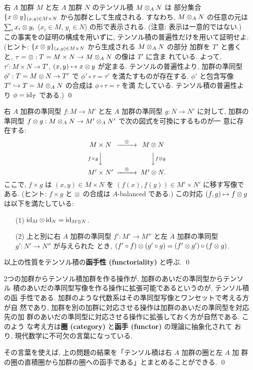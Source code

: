 \documentclass[12pt,twoside]{jarticle}
\begin{document}
\begin{question}
\label{q:right-exact-1}
  右 $A$ 加群 $M$ と左 $A$ 加群 $N$ のテンソル積 $M\otimes_A N$ は %
  部分集合 $\{x\otimes y\}_{(x,y)\in M\times N}$ から加群として生成される.
  すなわち, $M\otimes_A N$ の任意の元は $\sum_i x_i\otimes y_i$  ($x_i\in M$, 
  $y_i\in N$) の形で表示される.  (注意: 表示は一意的ではない.)
  この事実をの証明の構成を用いずに,
  テンソル積の普遍性だけを用いて証明せよ.
  (ヒント: $\{x\otimes y\}_{(x,y)\in M\times N}$ から生成される $M\otimes_A N$ の部分
  加群を $T'$ と書くと, $\tau=\otimes:T=M\times N\to M\otimes_A N$ の像は $T'$ に含ま
  れている. 
  よって, $\tau':M\times N\to T'$, $(x,y)\mapsto x\otimes y$ が定まる.
  テンソルの普遍性より, 加群の準同型 $\phi':T=M\otimes N\to T'$ 
  で $\phi'\circ\tau=\tau'$ を満たすものが存在する.
  $\phi'$ と包含写像 $T'\hookrightarrow T=M\otimes_A N$ の合成は $\phi\circ\tau=\tau$ を満
  たしている. テンソル積の普遍性より $\phi=\mathop{\mathrm{id}}\nolimits_T$ である.)
  \qed
\end{question}

\begin{question}[テンソル積の函手性]
  右 $A$ 加群の準同型 $f:M\to M'$ と左 $A$ 加群の準同型 $g:N\to N'$ に対して, 
  加群の準同型 $f\otimes g: M\otimes_A N \to M'\otimes_A N'$ で次の図式を可換にするものが一
  意に存在する:
  \begin{equation*}
    \begin{CD}
      M\times N       @>{\o}>> M\o N \\
      @V{f\times g}VV          @VV{f\o g}V \\
      M'\times N'     @>{\o}>> M'\o N.
    \end{CD}
  \end{equation*}
  ここで, $f\times g$ は $(x,y)\in M\times N$ 
  を $(f(x),f(y))\in M'\times N'$ に移す写像である. 
  (ヒント: $f\times g$ と $\otimes$ の合成は $A$-balanced である.)
  この対応 $(f,g)\mapsto f\otimes g$ は以下を満たしている:
  \begin{itemize}
  \item[(1)] $\mathop{\mathrm{id}}\nolimits_M\otimes \mathop{\mathrm{id}}\nolimits_N = \mathop{\mathrm{id}}\nolimits_{M\otimes N}$.
  \item[(2)] 上と別に右 $A$ 加群の準同型 $f':M'\to M''$ 
    と左 $A$ 加群の準同型 $g':N'\to N''$ が与えられた
    とき, $(f'\circ f)\otimes(g'\circ g) = (f'\otimes g')\circ(f\otimes g)$. 
  \end{itemize}
  以上の性質をテンソル積の{\bf 函手性 (functoriality)} と呼ぶ. \qed
\end{question}

\begin{guide}
  2つの加群からテンソル積加群を作る操作が, 加群のあいだの準同型からテンソル
  積のあいだの準同型写像を作る操作に拡張可能であるというのが, テンソル積の函
  手性である.  加群のような代数系はその準同型写像とワンセットで考える方が自
  然であり, 加群を別の加群に対応させる操作は加群のあいだの準同型を対応先の加
  群のあいだの準同型に対応させる操作に拡張しておく方が自然である.  このよう
  な考え方は{\bf 圈 (category)} と{\bf 函手 (functor)} の理論に抽象化されて
  おり, 現代数学に不可欠の言葉になっている. 

  その言葉を使えば, 上の問題の結果を「テンソル積は右 $A$ 加群の圈と左 $A$ 加
  群の圈の直積圈から加群の圈への函手である」とまとめることができる.
  \qed
\end{guide}
\end{document}
